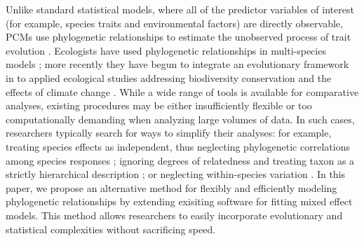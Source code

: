 \documentclass[12pt]{article}
\begin{document}
Unlike standard statistical models, where all of the predictor variables of interest (for example, species traits and environmental factors) are directly observable,  PCMs use phylogenetic relationships to estimate the unobserved process of trait evolution \citep{felsenstein1985phylogenies, butler2004phylogenetic}. 
Ecologists have used phylogenetic relationships in multi-species models \citep{garland1992procedures, freckleton2002phylogenetic, ord2010adaptation, davies2013phylogenetic}; more recently they have begun to integrate an evolutionary framework in to applied ecological studies addressing biodiversity conservation and the effects of climate change \citep{winter2013phylogenetic, santamaria2012evolution, lankau2011incorporating, lavergne2010biodiversity, mace2008evolutionary}.
While a wide range of tools is available for comparative analyses, existing procedures may be either insufficiently flexible or too computationally demanding when analyzing large volumes of data.
In such cases, researchers typically search for ways to simplify their analyses: for example, treating species effects as independent, thus neglecting phylogenetic correlations among species responses \citep{bunnefeld2012island}; ignoring degrees of relatedness and treating taxon as a strictly hierarchical description \citep{tella1999habitat}; or neglecting within-species variation \citep{ord2010adaptation}.
In this paper, we propose an alternative method for flexibly and efficiently modeling phylogenetic relationships by extending exisiting software for fitting mixed effect models. 
This method allows researchers to easily incorporate evolutionary and statistical complexities without sacrificing speed.
\end{document}
